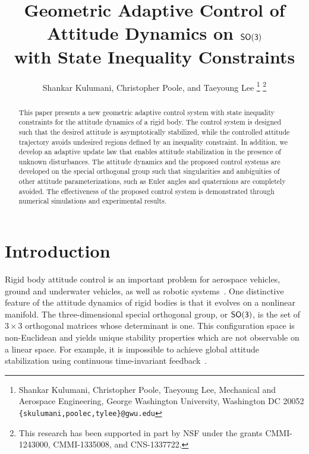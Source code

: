 \documentclass[letterpaper, 10 pt, conference]{ieeeconf}  %
\title{\LARGE \bf
Geometric Adaptive Control of Attitude Dynamics on $\mathsf{SO(3)}$\\ with State Inequality Constraints}
\author{Shankar Kulumani, Christopher Poole, and Taeyoung Lee
\thanks{Shankar Kulumani, Christopher Poole, Taeyoung Lee, Mechanical and Aerospace Engineering, George Washington University, Washington DC 20052 {\tt \{skulumani,poolec,tylee\}@gwu.edu}}
\thanks{This research has been supported in part by NSF under the grants CMMI-1243000, CMMI-1335008, and CNS-1337722.}
}
\begin{document}
\allowdisplaybreaks

\maketitle
\thispagestyle{empty}
\pagestyle{empty}


\begin{abstract}
This paper presents a new geometric adaptive control system with state inequality constraints for the attitude dynamics of a rigid body. 
The control system is designed such that the desired attitude is asymptotically stabilized, while the controlled attitude trajectory avoids undesired regions defined by an inequality constraint. 
In addition, we develop an adaptive update law that enables attitude stabilization in the presence of unknown disturbances. 
The attitude dynamics and the proposed control systems are developed on the special orthogonal group such that singularities and ambiguities of other attitude parameterizations, such as Euler angles and quaternions are completely avoided. 
The effectiveness of the proposed control system is demonstrated through numerical simulations and experimental results.
\end{abstract}


\section{Introduction}\label{sec:intro}

Rigid body attitude control is an important problem for aerospace vehicles, ground and underwater vehicles, as well as robotic systems~\cite{hughes2004,wertz1978}.
One distinctive feature of the attitude dynamics of rigid bodies is that it evolves on a nonlinear manifold.
The three-dimensional special orthogonal group, or \( \mathsf{SO(3)} \), is the set of \( 3 \times 3 \) orthogonal matrices whose determinant is one.
This configuration space is non-Euclidean and yields unique stability properties which are not observable on a linear space.
For example, it is impossible to achieve global attitude stabilization using continuous time-invariant feedback~\cite{bhat2000}.


\end{document}
